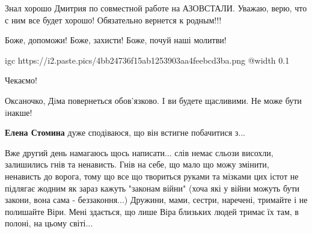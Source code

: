 
Знал хорошо Дмитрия по совместной работе на АЗОВСТАЛИ. Уважаю, верю, что с ним
все будет хорошо! Обязательно вернется к родным!!!


Боже, допоможи! Боже, захисти! Боже, почуй наші молитви!


\ifcmt
  igc https://i2.paste.pics/4bb24736f15ab1253903aa4feebcd3ba.png
	@width 0.1
\fi


Чекаємо!


Оксаночко, Дiма повернеться обов'язково. I ви будете щасливими. Не може бути iнакше!

\textbf{Елена Стомина} дуже сподіваюся, що він встигне побачитися з...


Вже другий день намагаюсь щось написати... слів немає сльози висохли, залишились
гнів та ненависть. Гнів на себе, що мало що можу змінити, ненависть до ворога,
тому що все що твориться руками та мізками цих істот не підлягає жодним як
зараз кажуть "законам війни" (хоча які у війни можуть бути закони, вона сама -
беззаконня...) Дружини, мами, сестри, наречені, тримайте і не полишайте Віри.
Мені здається, що лише Віра близьких людей тримає їх там, в полоні, на цьому
світі...
